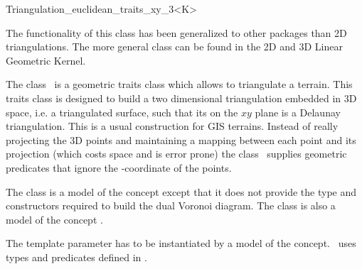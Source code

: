 

\begin{ccRefClass}{Triangulation_euclidean_traits_xy_3<K>}  %

The functionality of this class has been generalized to other packages than 2D triangulations.
The more general class  can be found in the 2D and 3D Linear Geometric Kernel.

\begin{ccDeprecated}

\ccDefinition
  
The class \ccRefName\ is a geometric traits class which allows to
triangulate
a terrain. This traits class is designed to build 
a two dimensional triangulation  embedded in 3D space,
i.e. a triangulated surface, such that 
its
on the $xy$ plane  is a Delaunay triangulation.
This is a usual construction for GIS terrains.
Instead of really projecting the 3D points and
maintaining a mapping between each point and its projection
 (which costs space and is error prone)
the class \ccRefName\  supplies geometric predicates that ignore the
-coordinate of the points.

The class is a model of the concept  
except that it does not provide the type and constructors
required to build the dual Voronoi diagram. The class is also a model
of the concept .

\ccParameters
The template parameter   has to
be instantiated by a model of the  concept.
\ccRefName\ uses types 
and predicates defined in .


\ccTypes
{}
\ccGlue
{}
\ccGlue
{}
\ccGlue
{}


\end{ccDeprecated}
\end{ccRefClass}
